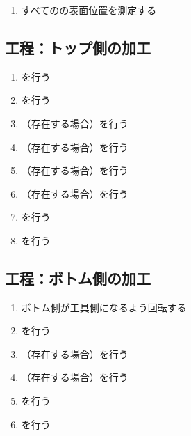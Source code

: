 \subsubsection{\DimpleMeasurement}
\begin{enumerate}[label*=\sarrow]
\item すべての\Dimple の表面位置を測定する
\end{enumerate}


\subsection{工程：トップ側の加工}
\begin{enumerate}[label*=\sarrow]
\item \DimpleMilling を行う
\item \TopEndFacecutMilling を行う
\item （存在する場合）\TopOutcutMilling を行う
\item （存在する場合）\TopCurvedOutcutMilling を行う
\item （存在する場合）\EndFaceBoringMilling を行う
\item （存在する場合）\IncutBoringMilling を行う
\item \TopEndFaceOutCChamferMilling を行う
\item \TopEndFaceInCChamferMilling を行う
\end{enumerate}


\clearpage
\subsection{工程：ボトム側の加工}
\begin{enumerate}[label*=\sarrow]
\item ボトム側が工具側になるよう回転する
\item \BottomEndFacecutMilling を行う
\item （存在する場合）\BottomOutcutMilling を行う
\item （存在する場合）\BottomCurvedOutcutMilling を行う
\item \BottomEndFaceOutCChamferMilling を行う
\item \BottomEndFaceInCChamferMilling を行う
\end{enumerate}


